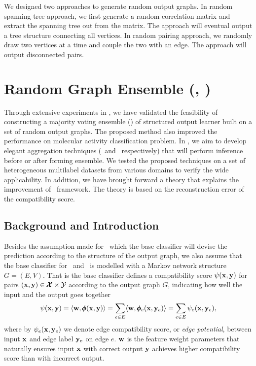 {We designed two approaches to generate random output graphs.
In random spanning tree approach, we first generate a random correlation matrix and extract the spanning tree out from the matrix.
The approach will eventual output a tree structure connecting all vertices.
In random pairing approach, we randomly draw two vertices at a time and couple the two with an edge.
The approach will output disconnected pairs.


\section{Random Graph Ensemble (\amm, \mam)}\label{sc_su14a}

Through extensive experiments in , we have validated the feasibility of constructing a majority voting ensemble (\mve) of structured output learner built on a set of random output graphs.
The proposed method also improved the performance on molecular activity classification problem.
In , we aim to develop elegant aggregation techniques (\amm\ and \mam\ respectively) that will perform inference before or after forming ensemble.
We tested the proposed techniques on a set of heterogeneous multilabel datasets from various domains to verify the wide applicability.
In addition, we have brought forward a theory that explains the improvement of \mam\ framework.
The theory is based on the reconstruction error of the compatibility score.


\subsection{Background and Introduction}

Besides the assumption made for \mve\ which the base classifier will devise the prediction according to the structure of the output graph, we also assume that the base classifier for \amm\ and \mam\ is modelled with a Markov network structure $G=(E,V)$.
That is the base classifier defines a compatibility score $\psi(\mathbf {x},\mathbf {y})$ for pairs $(\mathbf {x},\mathbf {y})\in\pmb {\mathcal{X}}\times\mathcal{Y}$ according to the output graph $G$, indicating how well the input and the output goes together
\begin{align*}
	\psi(\mathbf {x},\mathbf {y}) = \langle \mathbf {w}, \pmb \phi(\mathbf {x},\mathbf {y}) \rangle = \sum_{e\in E}\langle \mathbf {w}, \pmb \phi_e(\mathbf {x},\mathbf {y}_e) \rangle=\sum_{e\in E}\psi_e(\mathbf {x},\mathbf {y}_e),
\end{align*}
where by $\psi_e(\mathbf {x},\mathbf {y}_e)$ we denote edge compatibility score, or \textit{edge potential}, between input $\mathbf {x}$ and edge label $\mathbf {y}_e$ on edge $e$.
$\mathbf {w}$ is the feature weight parameters that naturally ensures input $\mathbf {x}$ with correct output $\mathbf {y}$ achieves higher compatibility score than with incorrect output.

}

